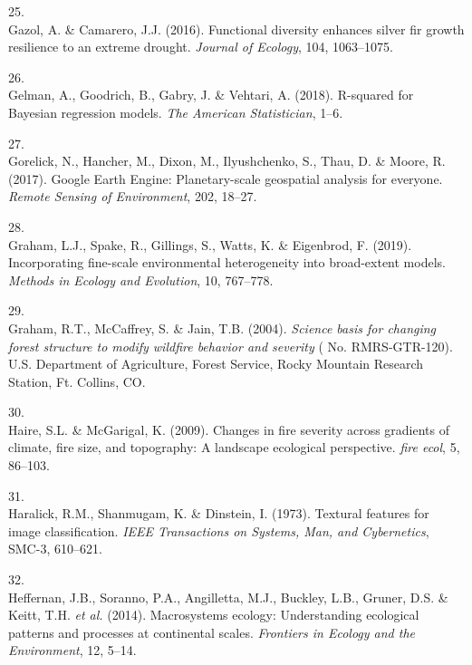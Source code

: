 \documentclass[]{article}
\begin{document}
\leavevmode\hypertarget{ref-gazol2016}{}%
25.\\
Gazol, A. \& Camarero, J.J. (2016). Functional diversity enhances silver
fir growth resilience to an extreme drought. \emph{Journal of Ecology},
104, 1063--1075.

\leavevmode\hypertarget{ref-gelman2018}{}%
26.\\
Gelman, A., Goodrich, B., Gabry, J. \& Vehtari, A. (2018). R-squared for
Bayesian regression models. \emph{The American Statistician}, 1--6.

\leavevmode\hypertarget{ref-gorelick2017}{}%
27.\\
Gorelick, N., Hancher, M., Dixon, M., Ilyushchenko, S., Thau, D. \&
Moore, R. (2017). Google Earth Engine: Planetary-scale geospatial
analysis for everyone. \emph{Remote Sensing of Environment}, 202,
18--27.

\leavevmode\hypertarget{ref-graham2019}{}%
28.\\
Graham, L.J., Spake, R., Gillings, S., Watts, K. \& Eigenbrod, F.
(2019). Incorporating fine-scale environmental heterogeneity into
broad-extent models. \emph{Methods in Ecology and Evolution}, 10,
767--778.

\leavevmode\hypertarget{ref-graham2004}{}%
29.\\
Graham, R.T., McCaffrey, S. \& Jain, T.B. (2004). \emph{Science basis
for changing forest structure to modify wildfire behavior and severity}
( No. RMRS-GTR-120). U.S. Department of Agriculture, Forest Service,
Rocky Mountain Research Station, Ft. Collins, CO.

\leavevmode\hypertarget{ref-haire2009}{}%
30.\\
Haire, S.L. \& McGarigal, K. (2009). Changes in fire severity across
gradients of climate, fire size, and topography: A landscape ecological
perspective. \emph{fire ecol}, 5, 86--103.

\leavevmode\hypertarget{ref-haralick1973}{}%
31.\\
Haralick, R.M., Shanmugam, K. \& Dinstein, I. (1973). Textural features
for image classification. \emph{IEEE Transactions on Systems, Man, and
Cybernetics}, SMC-3, 610--621.

\leavevmode\hypertarget{ref-heffernan2014}{}%
32.\\
Heffernan, J.B., Soranno, P.A., Angilletta, M.J., Buckley, L.B., Gruner,
D.S. \& Keitt, T.H. \emph{et al.} (2014). Macrosystems ecology:
Understanding ecological patterns and processes at continental scales.
\emph{Frontiers in Ecology and the Environment}, 12, 5--14.
\end{document}
